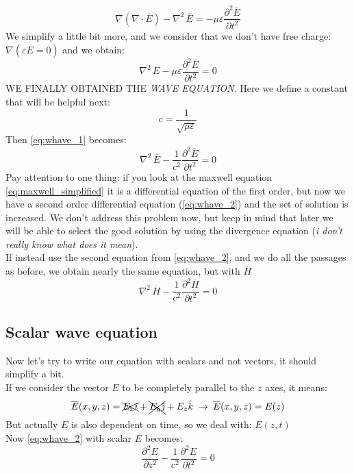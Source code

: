 \begin{equation}
    \nabla(\nabla\cdot \overline{E})-\nabla^2\,\overline{E}=-\mu \varepsilon \frac{\partial^2\overline{E}}{\partial t^2}
\end{equation}
We simplify a little bit more, and we consider that we don't have free charge: $\nabla(\varepsilon \overline{E}=0)$ and we obtain:
\begin{equation}\label{eq:whave_1}
    \nabla^2\,\overline{E}-\mu \varepsilon \frac{\partial^2\overline{E}}{\partial t^2}=0
\end{equation}
WE FINALLY OBTAINED THE \emph{WAVE EQUATION}. Here we define a constant that will be helpful next:
\begin{equation}
    c=\frac{1}{\sqrt{\mu\varepsilon}}
\end{equation}
Then \cref{eq:whave_1} becomes:
\begin{equation}\label{eq:whave_2}
    \nabla^2\,\overline{E}-\frac{1}{c^2} \frac{\partial^2\overline{E}}{\partial t^2}=0
\end{equation}
Pay attention to one thing: if you look at the maxwell equation \cref{eq:maxwell_simplified} it is a differential equation of the first order, but now we have a second order differential equation (\cref{eq:whave_2}) and the set of solution is increased. We don't address this problem now, but keep in mind that later we will be able to select the good solution by using the divergence equation (\textsl{i don't really know what does it mean}).\\
If instead use the second equation from \cref{eq:whave_2}, and we do all the passages as before, we obtain nearly the same equation, but with $\overline{H}$
\begin{equation}
    \nabla^2\,\overline{H}-\frac{1}{c^2} \frac{\partial^2\overline{H}}{\partial t^2}=0
\end{equation}
\subsection*{Scalar wave equation}
Now let's try to write our equation with scalars and not vectors, it should simplify a bit.\\
If we consider the vector $E$ to be completely parallel to the $z$ axes, it means:
\begin{equation}
    \overline{E}(x,y,z)=\xcancel{E_x\hat{\imath}}+\xcancel{E_y\hat{\jmath}}+E_z\hat{\mathnormal{k}}\;\rightarrow \:\overline{E}(x,y,z)=E(z)
\end{equation}
But actually $E$ is also dependent on time, so we deal with: $E(z,t)$\\
Now \cref{eq:whave_2} with scalar $E$ becomes:
\begin{equation}\label{eq:whave_simplified}
    \frac{\partial^2E}{\partial z^2}-\frac{1}{c^2} \frac{\partial^2E}{\partial t^2}=0
\end{equation}
